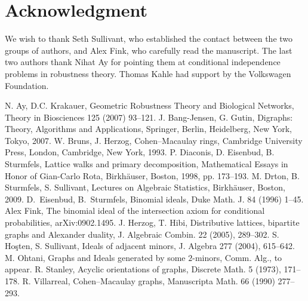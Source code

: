\documentclass[11pt]{amsart}
\begin{document}
\section*{Acknowledgment}
\label{sec:acknowledgment}
We wish to thank Seth Sullivant, who established the contact between the two groups of authors, and Alex Fink, who
carefully read the manuscript. The last two authors thank Nihat Ay for pointing them at conditional independence
problems in robustness theory. Thomas Kahle had support by the Volkswagen Foundation.

\begin{thebibliography}{}

 N. Ay, D.C. Krakauer,
Geometric Robustness Theory and Biological Networks,
Theory in Biosciences 125 (2007) 93--121.
 J. Bang-Jensen, G. Gutin,
Digraphs: Theory, Algorithms and Applications,
Springer, Berlin, Heidelberg, New York, Tokyo, 2007.
 W. Bruns, J. Herzog,
Cohen--Macaulay rings,
Cambridge University Press, London, Cambridge, New York, 1993.
 P. Diaconis, D. Eisenbud, B. Sturmfels,
Lattice walks and primary decomposition,
Mathematical Essays in Honor of Gian-Carlo Rota,
Birkh\"auser, Boston, 1998, pp. 173--193.
 M. Drton, B. Sturmfels, S. Sullivant,
Lectures on Algebraic Statistics,
Birkh\"auser, Boston, 2009.
 D.\ Eisenbud, B.\ Sturmfels,
Binomial ideals, Duke Math. J. 84 (1996) 1--45.
 Alex Fink,
The binomial ideal of the intersection axiom for conditional probabilities,
arXiv:0902.1495.
 J. Herzog, T. Hibi,
Distributive lattices, bipartite graphs and Alexander duality,
J. Algebraic Combin. 22 (2005), 289--302.
 S. Ho\c{s}ten, S. Sullivant,
Ideals of adjacent minors, J. Algebra 277 (2004), 615--642.
 M. Ohtani,
Graphs and Ideals generated by some $2$-minors,
Comm. Alg., to appear.
 R. Stanley, Acyclic orientations of graphs,
Discrete  Math. 5 (1973), 171--178.
 R. Villarreal, Cohen--Macaulay graphs,
Manuscripta Math. 66 (1990) 277--293.
\end{thebibliography}{}
\end{document}
